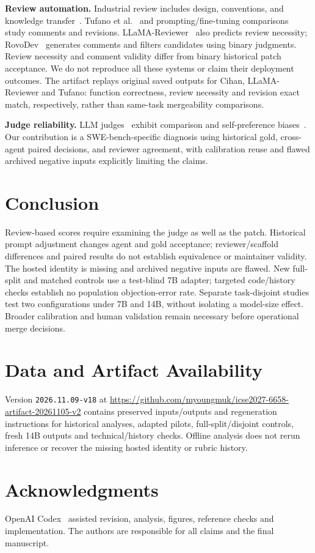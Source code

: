 \documentclass[10pt,conference]{IEEEtran}
\begin{document}
\textbf{Review automation.} Industrial review includes design, conventions, and knowledge
transfer~\cite{modernreview,bacchelli2013review,rigby2013convergent}.
Tufano et al.~\cite{tufanoreview} and prompting/fine-tuning
comparisons~\cite{promptreview} study comments and revisions. LLaMA-Reviewer~\cite{llamareviewer}
also predicts review necessity; RovoDev~\cite{rovodev} generates comments and filters
candidates using binary judgments. Review necessity and comment validity differ from
binary historical patch acceptance. We do not reproduce all these systems or claim
their deployment outcomes. The artifact replays original saved outputs for Cihan,
LLaMA-Reviewer and Tufano: function correctness, review necessity and revision exact
match, respectively, rather than same-task mergeability comparisons.

\textbf{Judge reliability.} LLM judges~\cite{llmjudge} exhibit comparison and self-preference
biases~\cite{wang2024fair,panickssery2024selfpref}. Our contribution is a SWE-bench-specific
diagnosis using historical gold, cross-agent paired decisions, and reviewer agreement,
with calibration reuse and flawed archived negative inputs explicitly limiting the claims.

\section{Conclusion}
Review-based scores require examining the judge as well as the patch. Historical prompt
adjustment changes agent and gold acceptance; reviewer/scaffold differences and paired
results do not establish equivalence or maintainer validity. The hosted identity is
missing and archived negative inputs are flawed. New full-split and matched controls
use a test-blind 7B adapter; targeted code/history checks establish no population
objection-error rate. Separate task-disjoint studies test two configurations under
7B and 14B, without isolating a model-size effect. Broader calibration and human validation remain necessary before
operational merge decisions.

\section*{Data and Artifact Availability}
Version \texttt{2026.11.09-v18} at
\url{https://github.com/myoungmuk/icse2027-6658-artifact-20261105-v2}
contains preserved inputs/outputs and regeneration instructions for historical analyses,
adapted pilots, full-split/disjoint controls, fresh 14B outputs and technical/history
checks. Offline analysis does not rerun inference or recover the missing hosted identity
or rubric history.

\section*{Acknowledgments}
OpenAI Codex~\cite{openaicodex} assisted revision, analysis, figures, reference checks and
implementation. The authors are responsible for all claims and the final manuscript.

\clearpage


\end{document}
